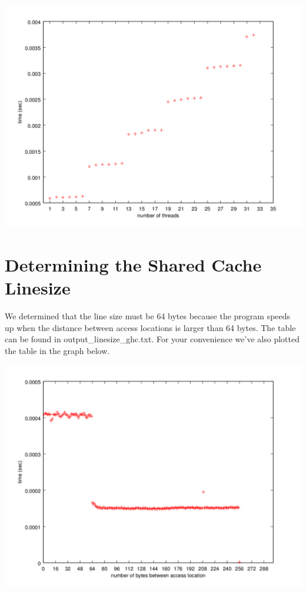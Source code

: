 \documentclass[10pt]{article}
\begin{document}
\begin{center}
\includegraphics[scale=0.50]{images/core}
\end{center}

\section*{Determining the Shared Cache Linesize}
We determined that the line size must be 64 bytes because the program speeds up
when the distance between access locations is larger than 64 bytes.
The table can be found in output\_linesize\_ghc.txt.  For your convenience
we've also plotted the table in the graph below.

\begin{center}
\includegraphics[scale=0.50]{images/linesize}
\end{center}
\end{document}
